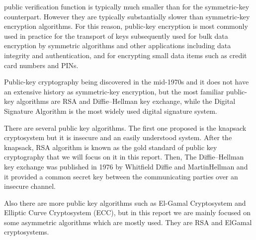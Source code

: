 \documentclass[12pt,journal,compsoc]{IEEEtran}
\begin{document}
public verification function is typically much smaller than for the
symmetric-key counterpart. However they are typically substantially
slower than symmetric-key encryption algorithms. For this reason,
public-key encryption is most commonly used in practice for the
transport of keys subsequently used for bulk data encryption by
symmetric algorithms and other applications including data integrity
and authentication, and for encrypting small data items such as credit
card numbers and PINs.
\par
Public-key cryptography being discovered in the mid-1970s and it does
not have an extensive history as symmetric-key encryption, but the
most familiar public-key algorithms are RSA and Diffie–Hellman key
exchange, while the Digital Signature Algorithm is the most widely
used digital signature system. 
\par
There are several public key algorithms. The first one proposed is the
knapsack cryptosystem but it is insecure and an easily understood
system. After the knapsack, RSA algorithm is known as the gold
standard of public key cryptography that we will focus on it in this
report. Then, The Diffie–Hellman key exchange was published in 1976 by
Whitfield Diffie and MartinHellman and it provided a common secret key
between the communicating parties over an insecure channel. 
\par
Also there are more public key algorithms such as El-Gamal
Cryptosystem and Elliptic Curve Cryptosystem (ECC), but in this report
we are mainly focused on some asymmetric algorithms which are mostly
used. They are RSA and ElGamal cryptosystems.  









\end{document}
